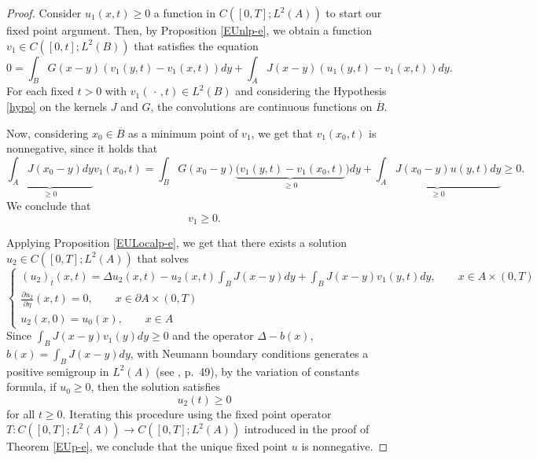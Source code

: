 \documentclass[reqno]{amsart}
\numberwithin{equation}{section}
\begin{document}
\begin{proof}
Consider $u_1(x,t)\geq 0$ a function in $C([0,T];L^2(A))$ to start our fixed point argument. Then, by Proposition \ref{EUnlp-e}, we obtain a function $v_1\in C([0,t];L^2(B))$ that satisfies the equation
\begin{equation}
    0=\int_B G(x-y)(v_1(y,t)-v_1(x,t))dy+\int_A J(x-y)(u_1(y,t)-v_1(x,t))dy.
\end{equation}
For each fixed $t>0$ with $v_1(\,\cdot\,,t)\in L^2(B)$ and considering the Hypothesis \ref{hypo} on the kernels $J$ and $G$, the convolutions are continuous functions on $\overline{B}$.  


Now, considering $x_0\in \overline{B}$ as a minimum point of $v_1$, we get that $v_1(x_0,t)$ is nonnegative, since
it holds that 
$$\underbrace{\int_{A}J(x_0-y)dy}_{\geq 0}v_1(x_0,t)=\int_B G(x_0-y)\underbrace{(v_1(y,t)-v_1(x_0,t)}_{\geq 0})dy+\underbrace{\int_AJ(x_0-y)u(y,t)dy}_{\geq 0} \geq 0.$$
We conclude that 
$$v_1\geq 0.$$ 

Applying Proposition \ref{EULocalp-e}, we get that there exists a solution $u_2\in C([0,T];L^2(A))$ that solves
    \begin{equation}
\begin{cases}
    {(u_2)}_t(x,t)=\Delta u_2(x,t) -u_2(x,t)\displaystyle\int_B J(x-y)dy+ \displaystyle\int_B J(x-y)v_1(y,t)dy, \qquad x\in A\times (0,T)  \\
\displaystyle    \frac{\partial u_2}{\partial \eta}(x,t)=0, \qquad x\in \partial A \times (0,T)\\
    u_2(x,0)=u_0(x), \qquad x\in A
\end{cases}\end{equation}
Since $\int_B J(x-y)v_1(y)dy\ge 0$ and the operator $\Delta-b(x)$, $b(x)=\int_B J(x-y)dy$, with Neumann boundary conditions generates a positive semigroup in $L^2(A)$ (see \cite{ouhabaz}, p.~49), by the variation of constants formula, if $u_0\ge 0$, 
then the solution satisfies $$u_2(t)\ge 0$$ for all $t\ge 0$.
Iterating this procedure using the fixed point operator $T:C([0,T];L^2(A))\to C([0,T];L^2(A))$ introduced in the proof of Theorem \ref{EUp-e}, we conclude that the unique fixed point $u$ is nonnegative.
\end{proof}
\end{document}
